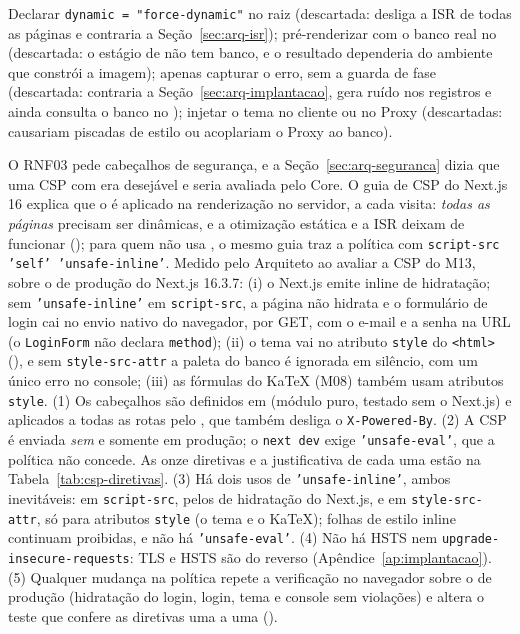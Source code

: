 {Declarar \texttt{dynamic = "force-dynamic"} no  raiz (descartada: desliga a ISR de todas as páginas e contraria a Seção~\ref{sec:arq-isr}); pré-renderizar com o banco real no  (descartada: o estágio de  não tem banco, e o resultado dependeria do ambiente que constrói a imagem); apenas capturar o erro, sem a guarda de fase (descartada: contraria a Seção~\ref{sec:arq-implantacao}, gera ruído nos registros e ainda consulta o banco no ); injetar o tema no cliente ou no Proxy (descartadas: causariam piscadas de estilo ou acoplariam o Proxy ao banco).}

{O RNF03 pede cabeçalhos de segurança, e a Seção~\ref{sec:arq-seguranca} dizia que uma CSP com  era desejável e seria avaliada pelo Core. O guia de CSP do Next.js 16 \cite{nextjsdocs} explica que o  é aplicado na renderização no servidor, a cada visita: \emph{todas as páginas} precisam ser dinâmicas, e a otimização estática e a ISR deixam de funcionar (); para quem não usa , o mesmo guia traz a política com \texttt{script-src 'self' 'unsafe-inline'}. Medido pelo Arquiteto ao avaliar a CSP do M13, sobre o  de produção do Next.js 16.3.7: (i) o Next.js emite  inline de hidratação; sem \texttt{'unsafe-inline'} em \texttt{script-src}, a página não hidrata e o formulário de login cai no envio nativo do navegador, por GET, com o e-mail e a senha na URL (o \texttt{LoginForm} não declara \texttt{method}); (ii) o tema vai no atributo \texttt{style} do \texttt{<html>} (), e sem \texttt{style-src-attr} a paleta do banco é ignorada em silêncio, com um único erro no console; (iii) as fórmulas do KaTeX (M08) também usam atributos \texttt{style}.}
{(1) Os cabeçalhos são definidos em  (módulo puro, testado sem o Next.js) e aplicados a todas as rotas pelo , que também desliga o \texttt{X-Powered-By}. (2) A CSP é enviada \emph{sem } e somente em produção; o \texttt{next dev} exige \texttt{'unsafe-eval'}, que a política não concede. As onze diretivas e a justificativa de cada uma estão na Tabela~\ref{tab:csp-diretivas}. (3) Há dois usos de \texttt{'unsafe-inline'}, ambos inevitáveis: em \texttt{script-src}, pelos  de hidratação do Next.js, e em \texttt{style-src-attr}, só para atributos \texttt{style} (o tema e o KaTeX); folhas de estilo inline continuam proibidas, e não há \texttt{'unsafe-eval'}. (4) Não há HSTS nem \texttt{upgrade-insecure-requests}: TLS e HSTS são do  reverso (Apêndice~\ref{ap:implantacao}). (5) Qualquer mudança na política repete a verificação no navegador sobre o  de produção (hidratação do login, login, tema e console sem violações) e altera o teste que confere as diretivas uma a uma ().}
